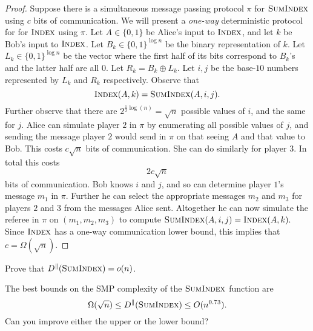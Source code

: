 \begin{proof}
Suppose there is a simultaneous message passing protocol $\pi$ for $\textsc{SumIndex}$ using $c$ bits of communication. We will present a \emph{one-way} deterministic protocol for for $\textsc{Index}$ using $\pi$. Let $A \in \{0,1\}$ be Alice's input to $\textsc{Index}$, and let $k$ be Bob's input to $\textsc{Index}$. Let $B_k \in \{0,1\}^{\log n}$ be the binary representation of $k$. Let $L_k\in \{0,1\}^{\log n}$ be the vector where the first half of its bits correspond to $B_k$'s and the latter half are all $0$. Let $R_k = B_k \oplus L_k$. Let $i, j$ be the base-$10$ numbers represented by $L_k$ and $R_k$ respectively. Observe that
$$\textsc{Index}(A,k) = \textsc{SumIndex}(A,i,j).$$
Further observe that there are $2^{\frac{1}{2}\log(n)} = \sqrt{n}$ possible values of $i$, and the same for $j$. Alice can simulate player $2$ in $\pi$ by enumerating all possible values of $j$, and sending the message player $2$ would send in $\pi$ on that seeing $A$ and that value to Bob. This costs $c\sqrt{n}$ bits of communication. She can do similarly for player $3$. In total this costs
$$2c\sqrt{n}$$
bits of communication. Bob knows $i$ and $j$, and so can determine player $1$'s message $m_1$ in $\pi$. Further he can select the appropriate messages $m_2$ and $m_3$ for players $2$ and $3$ from the messages Alice sent. Altogether he can now simulate the referee in $\pi$ on $(m_1,m_2,m_3)$ to compute $\textsc{SumIndex}(A,i,j) = \textsc{Index}(A,k).$ Since $\textsc{Index}$ has a one-way communication lower bound, this implies that $c = \Omega(\sqrt{n})$.
\end{proof}

\exercises

\begin{exercise}
Prove that $D^\parallel(\textsc{SumIndex}) = o(n)$.
\end{exercise}

\begin{open}
The best bounds on the SMP complexity of the $\textsc{SumIndex}$ function are
\[
\Omega(\sqrt{n}) \le D^\parallel(\textsc{SumIndex}) \le O(n^{0.73}).
\]
Can you improve either the upper or the lower bound?
\end{open}